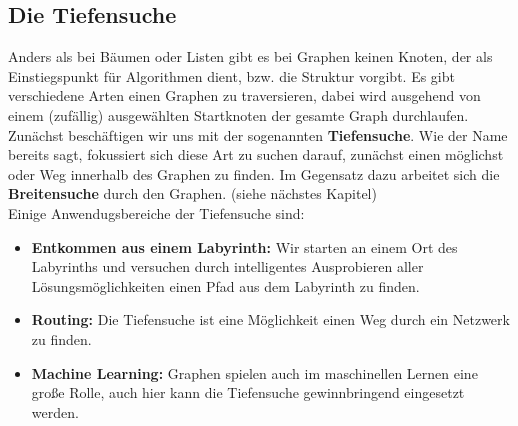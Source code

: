 \documentclass{article}
\begin{document}
\subsection{Die Tiefensuche}

Anders als bei Bäumen oder Listen gibt es bei Graphen keinen  Knoten, der als Einstiegspunkt für Algorithmen dient, bzw. die Struktur vorgibt. Es gibt verschiedene Arten einen Graphen zu traversieren, dabei wird ausgehend von einem (zufällig) ausgewählten Startknoten der gesamte Graph durchlaufen. Zunächst beschäftigen wir uns mit der sogenannten \textbf{Tiefensuche}. Wie der Name bereits sagt, fokussiert sich diese Art zu suchen darauf, zunächst einen möglichst  oder  Weg innerhalb des Graphen zu finden. Im Gegensatz dazu arbeitet sich die \textbf{Breitensuche}  durch den Graphen. (siehe nächstes Kapitel) \\
Einige Anwendugsbereiche der Tiefensuche sind: 
\begin{itemize}
    \item \textbf{Entkommen aus einem Labyrinth:} Wir starten an einem Ort des Labyrinths und versuchen durch intelligentes Ausprobieren aller Lösungsmöglichkeiten einen Pfad aus dem Labyrinth zu finden. 
    \item \textbf{Routing:} Die Tiefensuche ist eine Möglichkeit einen Weg durch ein Netzwerk zu finden. 
    \item \textbf{Machine Learning:} Graphen spielen auch im maschinellen Lernen eine große Rolle, auch hier kann die Tiefensuche gewinnbringend eingesetzt werden.
\end{itemize}
\end{document}
